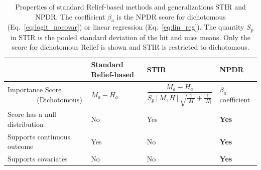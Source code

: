 \documentclass[10pt]{article}
\begin{document}
\begin{table}[h]

\begin{tabular}{p{4.5cm}C{2cm}C{3.2cm}C{2.7cm}}
                           & Standard Relief-based & STIR    & NPDR \\
\hline
Importance Score \,\,\,\,\,\,\,\,\,\,\,\,\,\,\,\,\,\,\,\,\,\,\, (Dichotomous)  & $\bar{M}_a - \bar{H}_a$  & $\dfrac{\bar{M}_a - \bar{H}_a }{S_p[M,H]\sqrt{\frac{1}{|M|}+\frac{1}{|H|}}}$ &  $\beta_a$ coefficient \\
Score has a null distribution & No                               & Yes     & {\bf Yes}  \\
Supports continuous outcome   & Yes                              & No      & {\bf Yes}  \\
Supports covariates           & No                               & No      & {\bf Yes} \\
\hline
\end{tabular}
\caption{Properties of standard Relief-based methods and generalizations STIR and NPDR. The coefficient $\beta_a$ is the NPDR score for dichotomous (Eq.~\ref{eq:logit_nocovar}) or linear regression (Eq.~\ref{eq:lin_reg}). The quantity $S_p$ in STIR is the pooled standard deviation of the hit and miss means. Only the score for dichotomous Relief is shown and STIR is restricted to dichotomous\cite{stir}.}
\label{tab:compare_npdr}
\end{table}

% 
\end{document}

